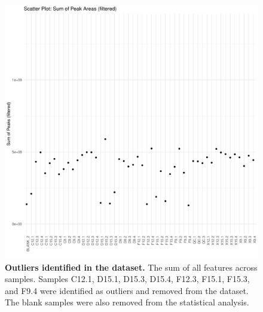 \begin{figure}[hp!]
    \centering
    \includegraphics[width=\textwidth]{Appendices/sum_plot-filtered.pdf}
    \caption[Outliers identified in the dataset] {\textbf{Outliers identified in the dataset.} The sum of all features across samples. Samples C12.1, D15.1, D15.3, D15.4, F12.3, F15.1, F15.3, and F9.4 were identified as outliers and removed from the dataset. The blank samples were also removed from the statistical analysis.} 
    \label{fig:SampleSumPlot}
\end{figure}

